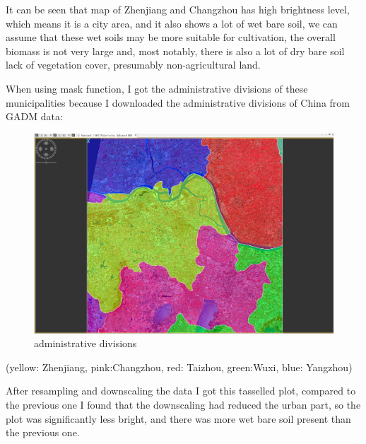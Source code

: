 \documentclass[
  letterpaper,
  DIV=11,
  numbers=noendperiod]{scrreprt}
\begin{document}
It can be seen that map of Zhenjiang and Changzhou has high brightness
level, which means it is a city area, and it also shows a lot of wet
bare soil, we can assume that these wet soils may be more suitable for
cultivation, the overall biomass is not very large and, most notably,
there is also a lot of dry bare soil lack of vegetation cover,
presumably non-agricultural land.

When using mask function, I got the administrative divisions of these
municipalities because I downloaded the administrative divisions of
China from GADM data:

\begin{figure}

{\centering \includegraphics[width=6.25in,height=\textheight]{./image/citys.png}

}

\caption{administrative divisions}

\end{figure}

(yellow: Zhenjiang, pink:Changzhou, red: Taizhou, green:Wuxi, blue:
Yangzhou)

After resampling and downscaling the data I got this tasselled plot,
compared to the previous one I found that the downscaling had reduced
the urban part, so the plot was significantly less bright, and there was
more wet bare soil present than the previous one.
\end{document}
